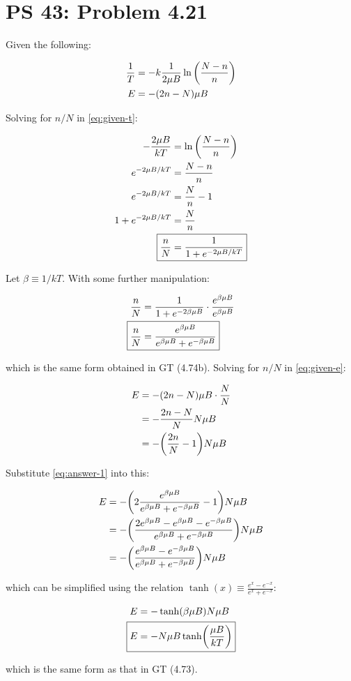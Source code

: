\documentclass[12pt,a4paper,twocolumn]{article}
\begin{document}
\setcounter{page}{1}

\section*{PS 43: Problem 4.21}
\bigskip

Given the following:

\begin{align}
	\frac{1}{T} &= -k\frac{1}{2\mu B}\ln\qty(\frac{N-n}{n}) \label{eq:given-t} \\
	E &= -(2n - N)\mu B \label{eq:given-e}
\end{align}

Solving for $n/N$ in \eqref{eq:given-t}:

\begin{align}
	-\frac{2\mu B}{kT} &= \ln\qty(\frac{N - n}{n}) \\
	e^{-2\mu B/kT} &= \frac{N-n}{n} \\
	e^{-2\mu B/kT} &= \frac{N}{n} - 1 \\
	1 + e^{-2\mu B/kT} &= \frac{N}{n} \\
	\Aboxed{
		\frac{n}{N} &= \frac{1}{1 + e^{-2\mu B/kT}}
	} \label{eq:answer-1}
\end{align}

Let $\beta \equiv 1/kT$. With some further manipulation:

\begin{align}
	\frac{n}{N} &= \frac{1}{1 + e^{-2\beta\mu B}} \cdot \frac{e^{\beta\mu B}}{e^{\beta\mu B}} \\
	\Aboxed{
	\frac{n}{N} &= \frac{e^{\beta\mu B}}{e^{\beta\mu B} + e^{-\beta\mu B}}
	} \label{eq:answer-2}
\end{align}

which is the same form obtained in GT (4.74b). Solving for $n/N$ in \eqref{eq:given-e}:

\begin{align}
	E &= -(2n - N)\mu B \cdot \frac{N}{N} \\
	&= -\frac{2n - N}{N}N\mu B \\
	&= -\qty(\frac{2n}{N} - 1)N\mu B
\end{align}

Substitute \eqref{eq:answer-1} into this:

\begin{align}
	E &= -\qty(2\frac{e^{\beta\mu B}}{e^{\beta\mu B} + e^{-\beta\mu B}} - 1)N\mu B \\
	&= -\qty(\frac{2e^{\beta\mu B} - e^{\beta\mu B} - e^{-\beta\mu B} }{e^{\beta\mu B} + e^{-\beta\mu B}})N\mu B \\
	&= -\qty(\frac{e^{\beta\mu B} - e^{-\beta\mu B} }{e^{\beta\mu B} + e^{-\beta\mu B}})N\mu B
\end{align}

which can be simplified using the relation $\tanh(x) \equiv \frac{e^{x} - e^{-x} }{e^{x} + e^{-x}}$:

\begin{align}
	E &= -\tanh(\beta\mu B)N\mu B \\
	\Aboxed{
		E &= -N\mu B\tanh(\frac{\mu B}{kT})
	} \label{eq:answer-3}
\end{align}

which is the same form as that in GT (4.73).
\end{document}
